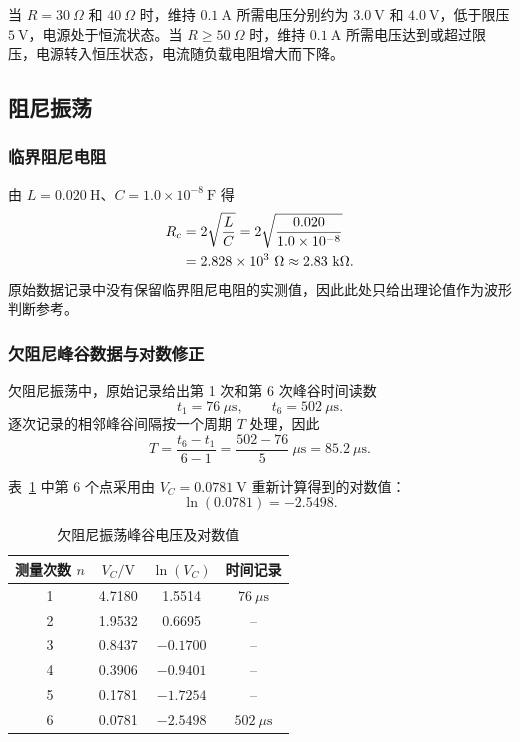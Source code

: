 ﻿\documentclass[UTF8,12pt,a4paper]{ctexart}
\numberwithin{equation}{section}
\begin{document}
当 \(R=30\ \Omega\) 和 \(40\ \Omega\) 时，维持 \(0.1\ \mathrm{A}\) 所需电压分别约为 \(3.0\ \mathrm{V}\) 和 \(4.0\ \mathrm{V}\)，低于限压 \(5\ \mathrm{V}\)，电源处于恒流状态。当 \(R\ge 50\ \Omega\) 时，维持 \(0.1\ \mathrm{A}\) 所需电压达到或超过限压，电源转入恒压状态，电流随负载电阻增大而下降。

\subsection{阻尼振荡}

\subsubsection{临界阻尼电阻}

由 \(L=0.020\ \mathrm{H}\)、\(C=1.0\times10^{-8}\ \mathrm{F}\) 得
\begin{align}
    R_c
    &=2\sqrt{\frac{L}{C}}
      =2\sqrt{\frac{0.020}{1.0\times10^{-8}}} \notag\\
    &=2.828\times10^3\ \Omega
      \approx 2.83\ \mathrm{k}\Omega.
\end{align}
原始数据记录中没有保留临界阻尼电阻的实测值，因此此处只给出理论值作为波形判断参考。

\subsubsection{欠阻尼峰谷数据与对数修正}

欠阻尼振荡中，原始记录给出第 1 次和第 6 次峰谷时间读数
\[
    t_1=76\ \mu\mathrm{s},\qquad t_6=502\ \mu\mathrm{s}.
\]
逐次记录的相邻峰谷间隔按一个周期 \(T\) 处理，因此
\begin{equation}
    T=\frac{t_6-t_1}{6-1}
    =\frac{502-76}{5}\ \mu\mathrm{s}
    =85.2\ \mu\mathrm{s}.
\end{equation}

表~\ref{tab:damping-data} 中第 6 个点采用由 \(V_C=0.0781\ \mathrm{V}\) 重新计算得到的对数值：
\[
    \ln(0.0781)=-2.5498.
\]

\begin{table}[H]
\centering
\caption{欠阻尼振荡峰谷电压及对数值}
\label{tab:damping-data}
\begin{tabular}{cccc}
\toprule
测量次数 \(n\) & \(V_C/\mathrm{V}\) & \(\ln(V_C)\) & 时间记录 \\
\midrule
1 & 4.7180 & 1.5514 & \(76\ \mu\mathrm{s}\) \\
2 & 1.9532 & 0.6695 & -- \\
3 & 0.8437 & \(-0.1700\) & -- \\
4 & 0.3906 & \(-0.9401\) & -- \\
5 & 0.1781 & \(-1.7254\) & -- \\
6 & 0.0781 & \(-2.5498\) & \(502\ \mu\mathrm{s}\) \\
\bottomrule
\end{tabular}
\end{table}
\end{document}
